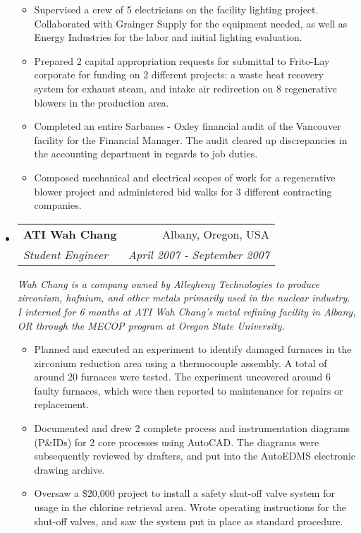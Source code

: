 \documentclass[a4paper,11pt]{article}
\makeatletter
\newcommand{\resitem}[1]{\item #1 \vspace{-2pt}}
\newcommand{\ressubheading}[4]{
\begin{tabular*}{6.5in}{l@{\cftdotfill{\cftsecdotsep}\extracolsep{\fill}}r}
        \textbf{#1} & #2 \\
        \textit{#3} & \textit{#4} \\
\end{tabular*}\vspace{-6pt}}
\makeatother
\begin{document}
\begin{itemize}
\begin{itemize}
            \resitem{Supervised a crew of 5 electricians on the facility lighting project. Collaborated with Grainger Supply for the equipment needed, as well as Energy Industries for the labor and initial lighting evaluation.}

            \resitem{Prepared 2 capital appropriation requests for submittal to Frito-Lay corporate for funding on 2 different projects: a waste heat recovery system for exhaust steam, and intake air redirection on 8 regenerative blowers in the production area.}

            \resitem{Completed an entire Sarbanes - Oxley financial audit of the Vancouver facility for the Financial Manager. The audit cleared up discrepancies in the accounting department in regards to job duties.}

            \resitem{Composed mechanical and electrical scopes of work for a regenerative blower project and administered bid walks for 3 different contracting companies.}

    \end{itemize}

\item

    \ressubheading{ATI Wah Chang}{Albany, Oregon, USA}{Student Engineer}{April 2007 - September 2007}
    \linebreak
    \linebreak
    \emph{Wah Chang is a company owned by Allegheny Technologies to produce zirconium, hafnium, and other metals primarily used in the nuclear industry. I interned for 6 months at ATI Wah Chang’s metal refining facility in Albany, OR through the MECOP program at Oregon State University.}
    \begin{itemize}
            \resitem{Planned and executed an experiment to identify damaged furnaces in the zirconium reduction area using a thermocouple assembly. A total of around 20 furnaces were tested. The experiment uncovered around 6 faulty furnaces, which were then reported to maintenance for repairs or replacement.}

            \resitem{Documented and drew 2 complete process and instrumentation diagrams (P\&IDs) for 2 core processes using AutoCAD. The diagrams were subsequently reviewed by drafters, and put into the AutoEDMS electronic drawing archive.}

            \resitem{Oversaw a \$20,000 project to install a safety shut-off valve system for usage in the chlorine retrieval area. Wrote operating instructions for the shut-off valves, and saw the system put in place as standard procedure.}

    \end{itemize}

\end{itemize}
\end{document}
